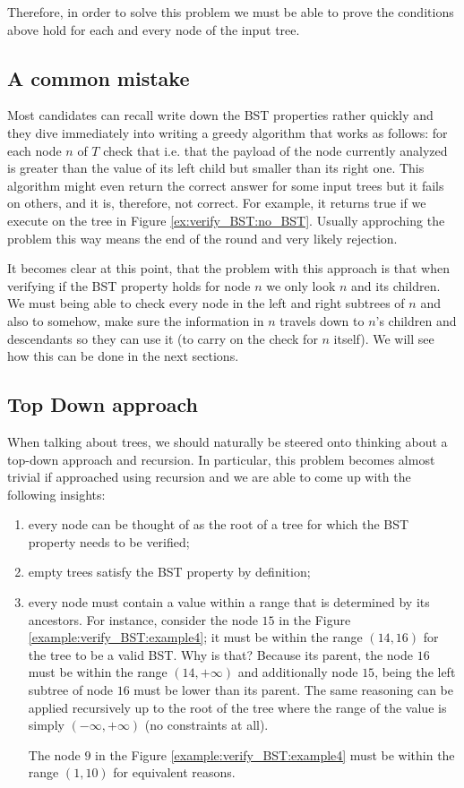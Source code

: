 Therefore, in order to solve this problem we must be able to prove the conditions above hold for each and every node of the input tree. 

\subsection{A common mistake}
Most candidates can recall write down the BST properties rather quickly and they dive immediately into writing a greedy algorithm that works as follows: for each node $n$ of $T$ check that 
 i.e. that the payload of the node currently  analyzed is greater than the value of its left child but smaller than its right one.
This algorithm might even return the correct answer for some input trees but it fails on others, and it is, therefore, not correct.
For example, it returns true if we execute on the tree in Figure \ref{ex:verify_BST:no_BST}.
Usually approching the problem this way means the end of the round and very likely  rejection. 

It becomes clear at this point, that the problem with this approach is that when verifying if the BST property holds for node $n$ we only look $n$ and its children. We must being able to check every node in the left and right subtrees of $n$ and also to somehow, make sure the information in $n$ travels down to $n$'s children and descendants so they can use it (to carry on the check for $n$ itself).
We will see how this can be done in the next sections.

\subsection{Top Down approach}
\label{verify_BST:sec:topdown}
When talking about trees, we should naturally be steered onto thinking about a top-down approach and recursion. 
In particular, this problem becomes almost trivial if approached using recursion and we are able to come up with the following insights:
\begin{enumerate}
	\item every node can be thought of as the root of a tree for which the BST property needs to be verified;
	\item empty trees satisfy the BST property by definition;
	\item every node must contain a value within a range that is determined by its ancestors. For instance, consider the node $15$ in the Figure \ref{example:verify_BST:example4}; it must be within the range $(14,16)$ for the tree to be a valid BST. Why is that? Because its parent, the node $16$ must be within the range $(14,+\infty)$ and additionally node $15$, being the left subtree of node $16$ must be lower than its parent. 
	The same reasoning can be applied recursively up to the root of the tree where the range of the value is simply $(-\infty, +\infty)$ (no constraints at all). 

	The node $9$ in the Figure \ref{example:verify_BST:example4} must be within the range $(1,10)$ for equivalent reasons.
\end{enumerate}

